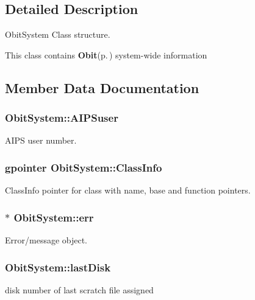 \subsection{Detailed Description}
Obit\-System Class structure. 

This class contains {\bf Obit}{\rm (p.\,\pageref{structObit})} system-wide information 



\subsection{Member Data Documentation}
\subsubsection{ {\bf Obit\-System::AIPSuser}}\label{structObitSystem_o10}


AIPS user number. 

\subsubsection{\setlength{\rightskip}{0pt plus 5cm}gpointer {\bf Obit\-System::Class\-Info}}\label{structObitSystem_o1}


Class\-Info pointer for class with name, base and function pointers. 

\subsubsection{$\ast$ {\bf Obit\-System::err}}\label{structObitSystem_o14}


Error/message object. 

\subsubsection{ {\bf Obit\-System::last\-Disk}}\label{structObitSystem_o11}


disk number of last scratch file assigned 

